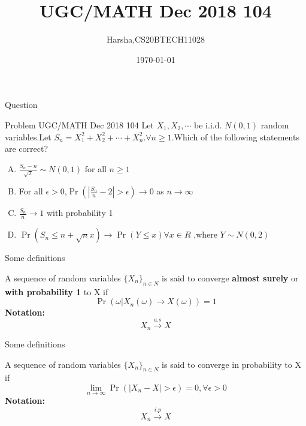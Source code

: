 \documentclass{beamer}
\title{UGC/MATH Dec 2018 104}
\author{Harsha,CS20BTECH11028}
\institute{IITH}
\date{\today}
\providecommand{\brak}[1]{\ensuremath{\left(#1\right)}}
\providecommand{\cbrak}[1]{\ensuremath{\{#1\}}}
\begin{document}
\begin{frame}
\titlepage
\end{frame}
\begin{frame}{Question}
\begin{block}{Problem UGC/MATH Dec 2018 104}
Let $X_1,X_2, \cdots$ be i.i.d. $N(0,1)$ random variables.Let $S_{n}=X_{1}^2+X_{2}^2+\cdots+X_{n}^2.\forall n\geq 1.$Which of the following statements are correct?
\begin{enumerate}[(A)]
\setlength\itemsep{1em}
\item $\frac{S_{n}-n}{\sqrt{2}}\sim N(0,1)$ for all $n\geq 1$
\item For all $\epsilon > 0$,$\Pr{\brak{\left|\frac{S_n}{n}-2\right|>\epsilon}}\to 0$ as $n \to \infty$
\item $\frac{S_{n}}{n} \to 1$ with probability 1
\item $\Pr({S_{n} \leq n+\sqrt{n}x}) \to \Pr({Y \leq x}) \forall x\in R$ ,where $Y \sim N(0,2)$
\end{enumerate}
\end{block}
\end{frame}
\begin{frame}{Some definitions}
\begin{definition}
A sequence of random variables $\cbrak{X_n}_{n\in N}$ is said to converge \textbf{almost surely} or \textbf{with probability 1} to X if \label{with prob 1}
\begin{equation}
    \Pr(\omega |X_n(\omega) \to X(\omega))=1
\end{equation}
\textbf{Notation:}
\begin{equation}
X_n \xrightarrow{a.s} X
\end{equation}
\end{definition}
\end{frame}
\begin{frame}{Some definitions}
\begin{definition}
A sequence of random variables $\cbrak{X_n}_{n\in N}$ is said to converge in probability to X if
\begin{equation}
    \lim_{n \to \infty} \Pr(\left| X_{n}-X\right|>\epsilon)=0 ,\forall \epsilon>0
\end{equation}\label{in prob}
\textbf{Notation:}
\begin{equation}
    X_{n} \xrightarrow{i.p} X
\end{equation}
\end{definition}
\end{frame}
\end{document}
